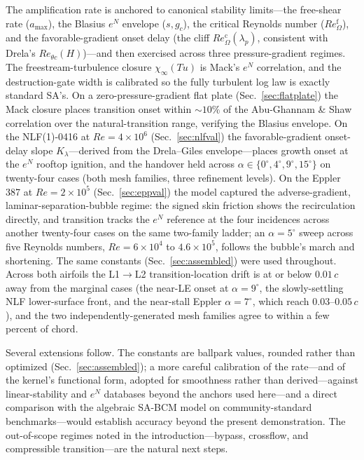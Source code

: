 \documentclass[journal]{new-aiaa}
\begin{document}
The amplification rate is anchored to canonical stability limits---the free-shear
rate ($a_{\max}$), the Blasius $e^N$ envelope ($s,g_c$), the critical Reynolds
number ($Re_\Omega^{\mathrm{f}}$), and the favorable-gradient onset delay (the
cliff $Re_\Omega^{\mathrm{c}}(\lambda_p)$, consistent with Drela's
$Re_{\theta c}(H)$)---and then exercised across three
pressure-gradient regimes. The freestream-turbulence
closure $\chi_\infty(Tu)$ is Mack's $e^N$ correlation, and the destruction-gate
width is calibrated so the fully turbulent log law is exactly standard
SA's. On a zero-pressure-gradient flat plate (Sec.~\ref{sec:flatplate}) the Mack
closure places transition onset within $\sim\!10\%$ of the Abu-Ghannam \& Shaw
correlation over the natural-transition range, verifying the Blasius envelope. On
the NLF(1)-0416 at $Re\!=\!4\!\times\!10^6$ (Sec.~\ref{sec:nlfval}) the
favorable-gradient onset-delay slope $K_\lambda$---derived from the Drela--Giles
envelope---places growth onset at the $e^N$ rooftop ignition, and the
handover held across $\alpha\!\in\!\{0^\circ,4^\circ,9^\circ,15^\circ\}$ on
twenty-four cases (both mesh families, three refinement levels). On the Eppler
387 at
$Re\!=\!2\!\times\!10^5$ (Sec.~\ref{sec:eppval}) the
model captured the adverse-gradient, laminar-separation-bubble regime: the signed
skin friction shows the recirculation directly, and transition tracks the $e^N$
reference at the four incidences across another twenty-four cases on the same
two-family ladder; an $\alpha\!=\!5^\circ$ sweep across five Reynolds numbers,
$Re\!=\!6\!\times\!10^4$ to $4.6\!\times\!10^5$, follows the bubble's march and
shortening. The same constants (Sec.~\ref{sec:assembled}) were used
throughout. Across both airfoils the L1$\to$L2 transition-location drift is at
or below $0.01\,c$ away from the marginal cases (the near-LE onset at
$\alpha\!=\!9^\circ$, the slowly-settling NLF lower-surface front, and the
near-stall Eppler $\alpha\!=\!7^\circ$, which reach
$0.03$--$0.05\,c$), and the two independently-generated mesh families agree to
within a few percent of chord.

Several extensions follow. The constants are ballpark values, rounded rather
than optimized (Sec.~\ref{sec:assembled}); a more careful calibration of the
rate---and of the kernel's functional form, adopted for smoothness rather
than derived---against
linear-stability and $e^N$ databases beyond the anchors used here---and a
direct comparison with the algebraic SA-BCM model on community-standard
benchmarks---would establish accuracy beyond the present demonstration.
The out-of-scope regimes noted in the introduction---bypass, crossflow, and
compressible transition---are the natural next steps.
\end{document}
